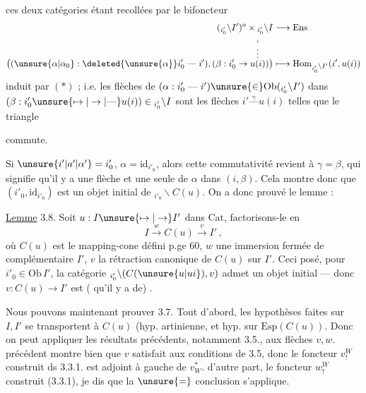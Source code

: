 ces deux catégories
étant recollées par le bifoncteur
\[
\begin{aligned}
(\mathord{}_{i'_0}\backslash I')^o\times \mathord{}_{i'_0}\backslash I&\longrightarrow\mathrm{Ens}\\
\big((\unsure{\alpha|\alpha_0}:\deleted{\unsure{\alpha}}i'_0\mathrel{\text{---}}i'),(\beta:i'_0\to\overset{\overset{i}{\vdots}}{u(i)})\big)
&\longmapsto\mathrm{Hom}_{\mathord{}_{i'_0}\backslash I'}(i',u(i))
\end{aligned}
\]
induit par $(*)$ ; i.e. les flèches de
$(\alpha:i'_0\mathrel{\text{---}}i')\unsure{\in}\mathrm{Ob}(\mathord{}_{i'_0}\backslash I')$ dans $(\beta:i'_0\unsure{\mapsto|\to|\text{---}}u(i))\in\mathord{}_{i'_0}\backslash I$
sont les flèches $i'\overset{\gamma}{\text{---}}u(i)$ telles que le
triangle


commute.

Si $\unsure{i'|a'|\alpha'}=i'_0$, $\alpha=\mathrm{id}_{i'_0}$, alors cette commutativité
revient à $\gamma=\beta$,  qui signifie qu'il
y a une flèche et une seule de
$\alpha$ dans $(i,\beta)$. Cela montre donc que
$(i'_0,\mathrm{id}_{i'_0})$ est un objet initial de $\mathord{}_{i'_0}\backslash C(u)$.
On a donc prouvé le lemme :

\uline{Lemme} 3.8. Soit \unsure{--} $u:I\unsure{\mapsto|\to} I'$ 
dans $\mathrm{Cat}$, factorisons-le en
\[
I\xrightarrow{w} C(u)\xrightarrow{v}I'\,,
\]
où $C(u)$ est le mapping-cone défini
p.ge 60, $w$ une immersion fermée
de complémentaire $I'$, $v$ la rétraction
canonique de $C(u)$ sur $I'$. Ceci
posé, pour  $i'_0\in\mathrm{Ob}\, I'$, la catégorie
$\mathord{}_{i'_0}\backslash(C(\unsure{u|ui}),v)$ admet un objet initial ---
donc $v:C(u)\longrightarrow I'$ est ( qu'il
y a de) .

Nous pouvons maintenant prouver
3.7. Tout d'abord, les hypothèses
faites sur $I,I'$ se transportent à
$C(u)$ (hyp. artinienne, et 
hyp.  sur $\mathrm{Esp}(C(u))$. Donc
on peut appliquer les résultats précédents,
notamment 3.5., aux flèches $v,w$. 
 précédent montre bien que $v$
satisfait aux conditions de 3.5, donc
le foncteur $v_!^W$ construit ds 3.3.1. est
adjoint à gauche de $v_W^*$.  d'autre part,
le foncteur $w_!^W$ construit  (3.3.1), je
dis que la $\unsure{=}$ conclusion s'applique.

